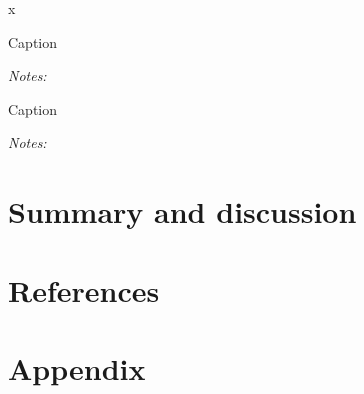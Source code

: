 x\documentclass[final, dvipsnames, authoryear,12pt]{elsarticle}
\begin{document}
\begin{table}[H]
    \caption{Caption}
    \label{tab:my_label}
    \centerline{}
    {\scriptsize \textit{Notes:}}
\end{table}

\begin{table}[H]
    \caption{Caption}
    \label{tab:my_label}
    \centerline{}
    {\scriptsize \textit{Notes:}}
\end{table}


\pagebreak
\newpage

\section{Summary and discussion}




\section{References}




\section{Appendix}
\end{document}
